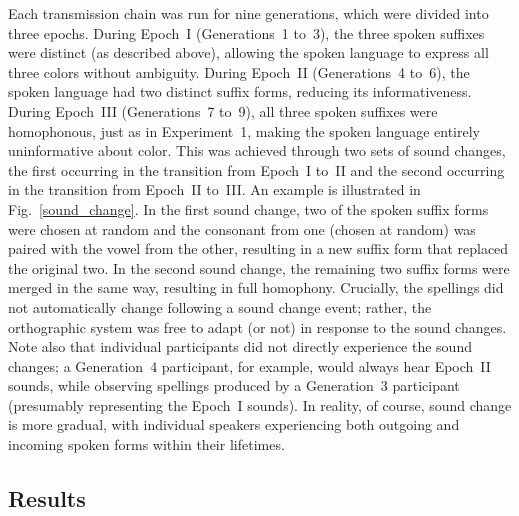 \documentclass[doc,biblatex]{apa7}
\begin{document}
Each transmission chain was run for nine generations, which were divided into three epochs. During Epoch~I (Generations~1 to~3), the three spoken suffixes were distinct (as described above), allowing the spoken language to express all three colors without ambiguity. During Epoch~II (Generations~4 to~6), the spoken language had two distinct suffix forms, reducing its informativeness. During Epoch~III (Generations~7 to~9), all three spoken suffixes were homophonous, just as in Experiment~1, making the spoken language entirely uninformative about color. This was achieved through two sets of sound changes, the first occurring in the transition from Epoch~I to~II and the second occurring in the transition from Epoch~II to~III. An example is illustrated in Fig.~\ref{sound_change}. In the first sound change, two of the spoken suffix forms were chosen at random and the consonant from one (chosen at random) was paired with the vowel from the other, resulting in a new suffix form that replaced the original two. In the second sound change, the remaining two suffix forms were merged in the same way, resulting in full homophony. Crucially, the spellings did not automatically change following a sound change event; rather, the orthographic system was free to adapt (or not) in response to the sound changes. Note also that individual participants did not directly experience the sound changes; a Generation~4 participant, for example, would always hear Epoch~II sounds, while observing spellings produced by a Generation~3 participant (presumably representing the Epoch~I sounds). In reality, of course, sound change is more gradual, with individual speakers experiencing both outgoing and incoming spoken forms within their lifetimes.

\subsection{Results}
\end{document}
